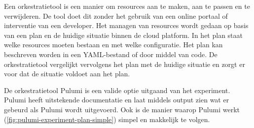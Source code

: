Een orkestratietool is een manier om resources aan te maken, aan te passen en te verwijderen. De tool doet dit zonder het gebruik van een online portaal of interventie van een developer. Het managen van resources wordt gedaan op basis van een plan en de huidige situatie binnen de cloud platform. In het plan staat welke resources moeten bestaan en met welke configuratie. Het plan kan beschreven worden in een YAML-bestand of door middel van code. De orkestratietool vergelijkt vervolgens het plan met de huidige situatie en zorgt er voor dat de situatie voldoet aan het plan.

De orkestratietool Pulumi is een valide optie uitgaand van het experiment. Pulumi heeft uitstekende documentatie en laat middels output zien wat er gebeurd als Pulumi wordt uitgevoerd. Ook is de manier waarop Pulumi werkt (\autoref{fig:pulumi-experiment-plan-simple}) simpel en makkelijk te volgen.